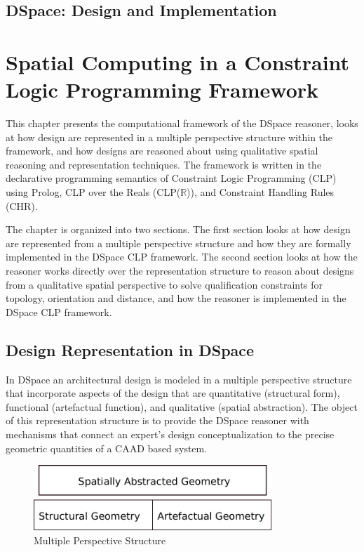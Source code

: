 \documentclass[12pt]{ucthesis}
\begin{document}
\section{DSpace: Design and Implementation}


\chapter{Spatial Computing in a Constraint Logic Programming Framework}
This chapter presents the computational framework of the DSpace reasoner, looks at how design are represented in a multiple perspective structure within the framework, and how designs are reasoned about using qualitative spatial reasoning and representation techniques. The framework is written in the declarative programming semantics of Constraint Logic Programming (CLP) using Prolog, CLP over the Reals (CLP($\mathbb{R}$)), and Constraint Handling Rules (CHR).  

The chapter is organized into two sections. The first section looks at how design are represented from a multiple perspective structure and how they are formally implemented in the DSpace CLP framework. The second section looks at how the reasoner works directly over the representation structure to reason about designs from a qualitative spatial perspective to solve qualification constraints for topology, orientation and distance, and how the reasoner is implemented in the DSpace CLP framework.

\section{Design Representation in DSpace}
In DSpace an architectural design is modeled in a multiple perspective structure that incorporate aspects of the design that are quantitative (structural form), functional (artefactual function), and qualitative (spatial abstraction). The object of this representation structure is to provide the DSpace reasoner with mechanisms that connect an expert's design conceptualization to the precise geometric quantities of a CAAD based system.   

\begin{figure}[H]
\centering
\includegraphics[width=90mm]{multi-persepective}
\caption{Multiple Perspective Structure}
\label{mutli-perspective}
\end{figure}
\end{document}
